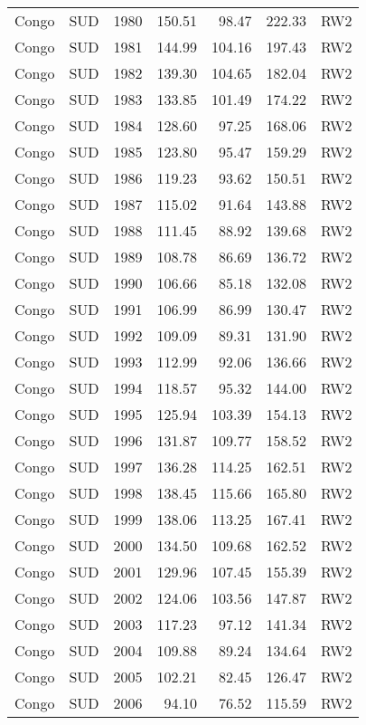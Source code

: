 \begin{longtable}{lllrrrl}
  Congo & SUD & 1980 & 150.51 & 98.47 & 222.33 & RW2 \\ 
  Congo & SUD & 1981 & 144.99 & 104.16 & 197.43 & RW2 \\ 
  Congo & SUD & 1982 & 139.30 & 104.65 & 182.04 & RW2 \\ 
  Congo & SUD & 1983 & 133.85 & 101.49 & 174.22 & RW2 \\ 
  Congo & SUD & 1984 & 128.60 & 97.25 & 168.06 & RW2 \\ 
  Congo & SUD & 1985 & 123.80 & 95.47 & 159.29 & RW2 \\ 
  Congo & SUD & 1986 & 119.23 & 93.62 & 150.51 & RW2 \\ 
  Congo & SUD & 1987 & 115.02 & 91.64 & 143.88 & RW2 \\ 
  Congo & SUD & 1988 & 111.45 & 88.92 & 139.68 & RW2 \\ 
  Congo & SUD & 1989 & 108.78 & 86.69 & 136.72 & RW2 \\ 
  Congo & SUD & 1990 & 106.66 & 85.18 & 132.08 & RW2 \\ 
  Congo & SUD & 1991 & 106.99 & 86.99 & 130.47 & RW2 \\ 
  Congo & SUD & 1992 & 109.09 & 89.31 & 131.90 & RW2 \\ 
  Congo & SUD & 1993 & 112.99 & 92.06 & 136.66 & RW2 \\ 
  Congo & SUD & 1994 & 118.57 & 95.32 & 144.00 & RW2 \\ 
  Congo & SUD & 1995 & 125.94 & 103.39 & 154.13 & RW2 \\ 
  Congo & SUD & 1996 & 131.87 & 109.77 & 158.52 & RW2 \\ 
  Congo & SUD & 1997 & 136.28 & 114.25 & 162.51 & RW2 \\ 
  Congo & SUD & 1998 & 138.45 & 115.66 & 165.80 & RW2 \\ 
  Congo & SUD & 1999 & 138.06 & 113.25 & 167.41 & RW2 \\ 
  Congo & SUD & 2000 & 134.50 & 109.68 & 162.52 & RW2 \\ 
  Congo & SUD & 2001 & 129.96 & 107.45 & 155.39 & RW2 \\ 
  Congo & SUD & 2002 & 124.06 & 103.56 & 147.87 & RW2 \\ 
  Congo & SUD & 2003 & 117.23 & 97.12 & 141.34 & RW2 \\ 
  Congo & SUD & 2004 & 109.88 & 89.24 & 134.64 & RW2 \\ 
  Congo & SUD & 2005 & 102.21 & 82.45 & 126.47 & RW2 \\ 
  Congo & SUD & 2006 & 94.10 & 76.52 & 115.59 & RW2 \\ 

\end{longtable}
